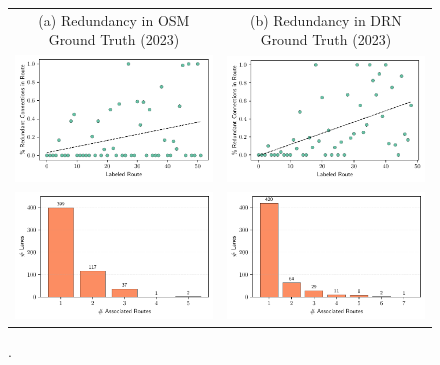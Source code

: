 \begin{figure}[htbp]
\centering 
\begin{tabular}{cc}
\footnotesize{(a) Redundancy in OSM Ground Truth (2023)} & \footnotesize{(b) Redundancy in DRN Ground Truth (2023)} \\
\includegraphics[width=0.45\linewidth]{images/matching-ground-truth-progression-osm.pdf} & \includegraphics[width=0.45\linewidth]{images/matching-ground-truth-progression-drn.pdf} \\
\includegraphics[width=0.45\linewidth]{images/matching-ground-truth-lsas-per-route-osm.pdf} & \includegraphics[width=0.45\linewidth]{images/matching-ground-truth-lsas-per-route-drn.pdf} \\
\end{tabular}
\caption{.}
\label{fig:}
\end{figure}

